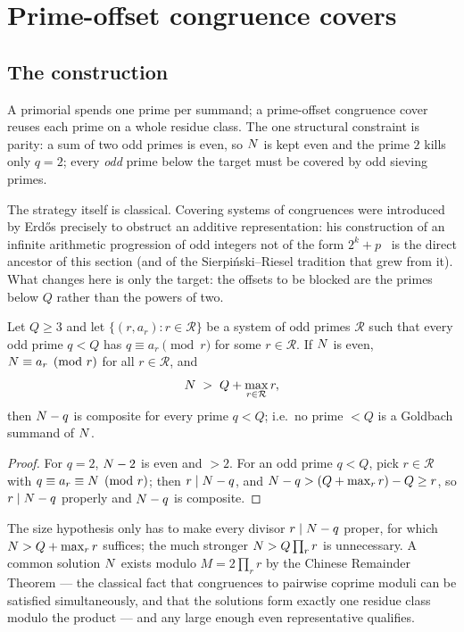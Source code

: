\section{Prime-offset congruence covers}\label{sec:covering}

\subsection{The construction}

A primorial spends one prime per summand; a prime-offset congruence
cover reuses each prime on a whole residue class. The one structural
constraint is parity: a sum of two odd primes is even, so $N$ is kept
even and the prime $2$ kills only $q=2$; every \emph{odd} prime below
the target must be covered by odd sieving primes.

The strategy itself is classical. Covering systems of congruences were
introduced by Erd\H{o}s precisely to obstruct an additive
representation: his construction of an infinite arithmetic progression
of odd integers not of the form $2^k+p$~\cite{Erdos1950} is the direct
ancestor of this section (and of the Sierpi\'nski--Riesel tradition that
grew from it). What changes here is only the target: the offsets to be
blocked are the primes below $Q$ rather than the powers of two.

\begin{proposition}\label{prop:cover}
Let $Q\ge3$ and let $\{(r,a_r):r\in\mathcal R\}$ be a system of odd
primes $\mathcal R$ such that every odd prime $q<Q$ has
$q\equiv a_r\pmod r$ for some $r\in\mathcal R$. If $N$ is even,
$N\equiv a_r\pmod r$ for all $r\in\mathcal R$, and
\[
N\;>\;Q+\max_{r\in\mathcal R}r,
\]
then $N-q$ is composite for every prime $q<Q$; i.e.\ no prime $<Q$ is a
Goldbach summand of $N$.
\end{proposition}
\begin{proof}
For $q=2$, $N-2$ is even and $>2$. For an odd prime $q<Q$, pick
$r\in\mathcal R$ with $q\equiv a_r\equiv N\pmod r$; then $r\mid N-q$,
and $N-q>(Q+\max_r r)-Q\ge r$, so $r\mid N-q$ properly and $N-q$ is
composite.
\end{proof}

\begin{remark}
The size hypothesis only has to make every divisor $r\mid N-q$ proper,
for which $N>Q+\max_r r$ suffices; the much stronger $N>Q\prod_r r$ is
unnecessary. A common solution $N$ exists modulo $M=2\prod_{r}r$ by the
Chinese Remainder Theorem --- the classical fact that congruences to
pairwise coprime moduli can be satisfied simultaneously, and that the
solutions form exactly one residue class modulo the product --- and any
large enough even representative qualifies.
\end{remark}

